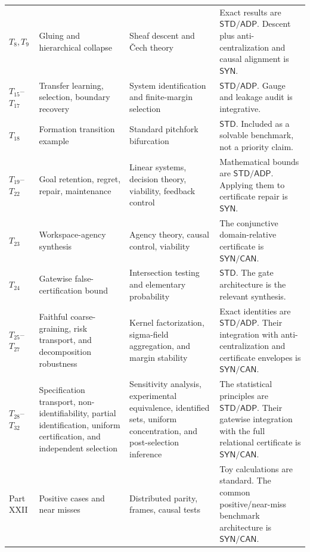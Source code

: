\begin{longtable}{@{}>{\raggedright\arraybackslash}p{}>{\raggedright\arraybackslash}p{}>{\raggedright\arraybackslash}p{}>{\raggedright\arraybackslash}p{}@{}}
\(T_8,T_9\) & Gluing and hierarchical collapse & Sheaf descent and \v{C}ech theory & Exact results are \(\mathsf{STD}/\mathsf{ADP}\). Descent plus anti-centralization and causal alignment is \(\mathsf{SYN}\). \\
\(T_{15}\)--\(T_{17}\) & Transfer learning, selection, boundary recovery & System identification and finite-margin selection & \(\mathsf{STD}/\mathsf{ADP}\). Gauge and leakage audit is integrative. \\
\(T_{18}\) & Formation transition example & Standard pitchfork bifurcation & \(\mathsf{STD}\). Included as a solvable benchmark, not a priority claim. \\
\(T_{19}\)--\(T_{22}\) & Goal retention, regret, repair, maintenance & Linear systems, decision theory, viability, feedback control & Mathematical bounds are \(\mathsf{STD}/\mathsf{ADP}\). Applying them to certificate repair is \(\mathsf{SYN}\). \\
\(T_{23}\) & Workspace-agency synthesis & Agency theory, causal control, viability & The conjunctive domain-relative certificate is \(\mathsf{SYN}/\mathsf{CAN}\). \\
\(T_{24}\) & Gatewise false-certification bound & Intersection testing and elementary probability & \(\mathsf{STD}\). The gate architecture is the relevant synthesis. \\
\(T_{25}\)--\(T_{27}\) & Faithful coarse-graining, risk transport, and decomposition robustness & Kernel factorization, sigma-field aggregation, and margin stability & Exact identities are \(\mathsf{STD}/\mathsf{ADP}\). Their integration with anti-centralization and certificate envelopes is \(\mathsf{SYN}/\mathsf{CAN}\). \\
\(T_{28}\)--\(T_{32}\) & Specification transport, non-identifiability, partial identification, uniform certification, and independent selection & Sensitivity analysis, experimental equivalence, identified sets, uniform concentration, and post-selection inference & The statistical principles are \(\mathsf{STD}/\mathsf{ADP}\). Their gatewise integration with the full relational certificate is \(\mathsf{SYN}/\mathsf{CAN}\). \\
Part XXII & Positive cases and near misses & Distributed parity, frames, causal tests & Toy calculations are standard. The common positive/near-miss benchmark architecture is \(\mathsf{SYN}/\mathsf{CAN}\). \\
\bottomrule
\end{longtable}
\normalsize


